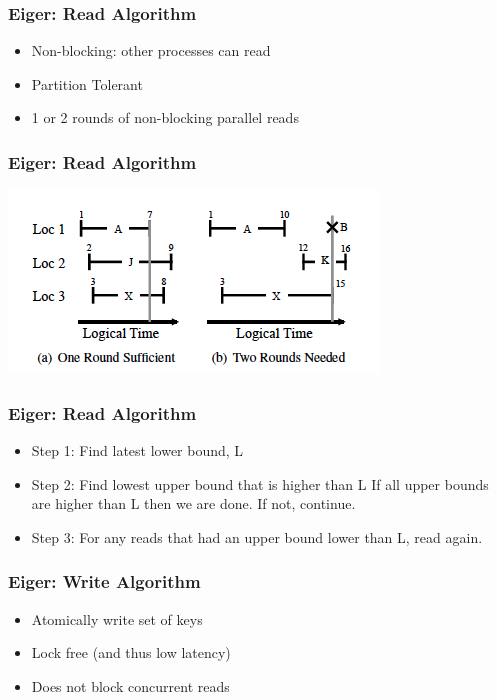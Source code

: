 \documentclass{beamer}
\begin{document}
\begin{frame}
\frametitle{Eiger: Read Algorithm}
\begin{itemize}
\item Non-blocking: other processes can read
\item Partition Tolerant
\item 1 or 2 rounds of non-blocking parallel reads
\end{itemize}  
\end{frame}

\begin{frame}
\frametitle{Eiger: Read Algorithm}
\includegraphics[scale=0.80]{Figure_Read.png}
\end{frame}

\begin{frame}
\frametitle{Eiger: Read Algorithm}
\begin{itemize}
\item Step 1: Find latest lower bound, L
\item Step 2: Find lowest upper bound that is higher than L
\newline If all upper bounds are higher than L then we are done.  If not, continue. 
\item Step 3: For any reads that had an upper bound lower than L, read again.
\end{itemize}  
\end{frame}


\begin{frame}
\frametitle{Eiger: Write Algorithm}
\begin{itemize}
\item Atomically write set of keys
\item Lock free (and thus low latency)
\item Does not block concurrent reads
\end{itemize}  
\end{frame}
\end{document}
